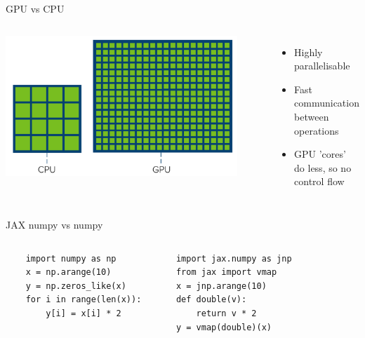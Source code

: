 \documentclass[aspectratio=169]{beamer}
\begin{document}
\begin{frame}{GPU vs CPU}
  \begin{columns}
      \centering
      \includegraphics[width=0.9\textwidth]{images/cpuvgpu.png}
      \begin{itemize}
        \item Highly parallelisable
        \item Fast communication between operations
        \item GPU 'cores' do less, so no control flow
      \end{itemize}
  \end{columns}
\end{frame}

\begin{frame}[fragile]{JAX numpy vs numpy}
  \begin{columns}
    \begin{verbatim}
    import numpy as np
    x = np.arange(10)
    y = np.zeros_like(x)
    for i in range(len(x)):
        y[i] = x[i] * 2
    \end{verbatim}
    \begin{verbatim}
    import jax.numpy as jnp
    from jax import vmap
    x = jnp.arange(10)
    def double(v):
        return v * 2
    y = vmap(double)(x)
    \end{verbatim}
  \end{columns}
\end{frame}
\end{document}
